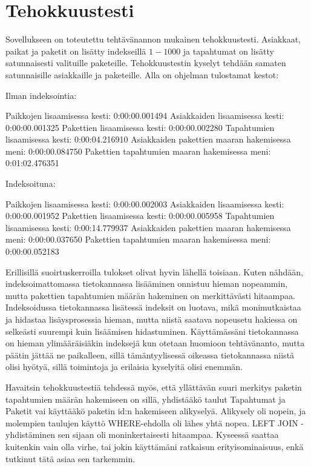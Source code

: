 \documentclass{scrartcl}
\begin{document}
\section{Tehokkuustesti}

Sovellukseen on toteutettu tehtävänannon mukainen tehokkuustesti. Asiakkaat, paikat ja paketit on lisätty indekseillä $1-1000$ ja tapahtumat on lisätty satunnaisesti valituille paketeille. Tehokkuustestin kyselyt tehdään samaten satunnaisille asiakkaille ja paketeille. Alla on ohjelman tulostamat kestot:

\begin{code}
  Ilman indeksointia:

  Paikkojen lisaamisessa kesti: 0:00:00.001494
  Asiakkaiden lisaamisessa kesti: 0:00:00.001325
  Pakettien lisaamisessa kesti: 0:00:00.002280
  Tapahtumien lisaamisessa kesti: 0:00:04.216910
  Asiakkaiden pakettien maaran hakemisessa meni: 0:00:00.084750
  Pakettien tapahtumien maaran hakemisessa meni: 0:01:02.476351


  Indeksoituna:

  Paikkojen lisaamisessa kesti: 0:00:00.002003
  Asiakkaiden lisaamisessa kesti: 0:00:00.001952
  Pakettien lisaamisessa kesti: 0:00:00.005958
  Tapahtumien lisaamisessa kesti: 0:00:14.779937
  Asiakkaiden pakettien maaran hakemisessa meni: 0:00:00.037650
  Pakettien tapahtumien maaran hakemisessa meni: 0:00:00.052183
\end{code}

Erillisillä suoirtuskerroilla tulokset olivat hyvin lähellä toisiaan. Kuten nähdään, indeksoimattomassa tietokannassa lisääminen onnistuu hieman nopeammin, mutta pakettien tapahtumien määrän hakeminen on merkittävästi hitaampaa. Indeksoidussa tietokannassa lisätessä indeksit on luotava, mikä monimutkaistaa ja hidastaa lisäysprosessia hieman, mutta niistä saatava nopeusetu hakiessa on selkeästi suurempi kuin lisäämisen hidastuminen. Käyttämässäni tietokannassa on hieman ylimääräisiäkin indeksejä kun otetaan huomioon tehtävänanto, mutta päätin jättää ne paikalleen, sillä tämäntyylisessä oikeassa tietokannassa niistä olisi hyötyä, sillä toimintoja ja erilaisia kyselyitä olisi enemmän.

Havaitsin tehokkuustestiä tehdessä myös, että yllättävän suuri merkitys paketin tapahtumien määrän hakemiseen on sillä, yhdistääkö taulut Tapahtumat ja Paketit vai käyttääkö paketin id:n hakemiseen alikyselyä. Alikysely oli nopein, ja molempien taulujen käyttö WHERE-ehdolla oli lähes yhtä nopea. LEFT JOIN -yhdistäminen sen sijaan oli moninkertaisesti hitaampaa. Kyseessä saattaa kuitenkin vain olla virhe, tai jokin käyttämäni ratkaisun erityisominaisuus, enkä tutkinut tätä asiaa sen tarkemmin.
\end{document}
